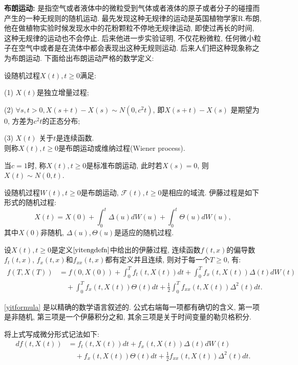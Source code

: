     {\bf 布朗运动:} 是指空气或者液体中的微粒受到气体或者液体的原子或者分子的碰撞而产生的一种无规则的随机运动. 最先发现这种无规律的运动是英国植物学家R.布朗, 他在做植物实验时候发现水中的花粉颗粒不停地无规律运动, 即使过再长的时间, 这种无规律的运动也不会停止. 后来他进一步实验证明, 不仅花粉微粒, 任何微小粒子在空气中或者是在流体中都会表现出这种无规则运动. 后来人们把这种现象称之为布朗运动. 下面给出布朗运动严格的数学定义:
    \begin{defn}
          设随机过程$X(t), t\geq0$满足:

          (1) $X(t)$是独立增量过程;

          (2) $\forall s,t>0, X(s+t)-X(s)\sim N(0,c^2t)$, 即$X(s+t)-X(s)$ 是期望为$0$, 方差为$c^2t$的正态分布;

          (3) $X(t)$ 关于$t$是连续函数.\\
          则称$X(t), t\geq0$是布朗运动或维纳过程(Wiener process).
    \end{defn}
当$c=1$时, 称$X(t), t\geq0$是标准布朗运动, 此时若$X(s)=0$, 则$X(t)\sim N(0,t)$.
    \begin{defn}[伊藤过程]{\rm{}}\label{yitengdefn}
          设随机过程$W(t), t\geq0$是布朗运动, $\mathcal{F}(t), t\geq0$是相应的域流. 伊藤过程是如下形式的随机过程:
          $$X(t)=X(0)+\int_0^t\Delta(u)dW(u)+\int_0^t\Theta(u)dW(u),$$
          其中$X(0)$非随机, $\Delta(u), \Theta(u)$是适应的随机过程.
    \end{defn}
    \begin{lem}[伊藤—德布林公式]{\rm{}}\label{yitformula}
           设$X(t), t\geq0$是定义$\ref{yitengdefn}$中给出的伊藤过程, 连续函数$f(t,x)$的偏导数$f_t(t,x)$, $f_x(t,x)$和$f_{xx}(t,x)$都有定义并且连续, 则对于每一个$T\geq0$, 有:
            \begin{align*}
                f(T,X(T))&=f(0,X(0))+\int_0^Tf_t(t,X(t))dt+\int_0^Tf_x(t,X(t))\Delta(t)dW(t)\\
                &\quad+\int_0^Tf_x(t,X(t))\Theta(t)dt+\frac{1}{2}\int_0^Tf_{xx}(t,X(t))\Delta^2(t)dt.
            \end{align*}
    \end{lem}
    \begin{rem}
        \autoref{yitformula} 是以精确的数学语言叙述的. 公式右端每一项都有确切的含义, 第一项是非随机, 第三项是一个伊藤积分之和, 其余三项是关于时间变量的勒贝格积分.
    \end{rem}
    将上式写成微分形式记法如下:
    \begin{align*}
                df(t,X(t))&=f_t(t,X(t))dt+f_x(t,X(t))\Delta(t)dW(t)\\
                &\quad+f_x(t,X(t))\Theta(t)dt+\frac{1}{2}f_{xx}(t,X(t))\Delta^2(t)dt.
    \end{align*}

